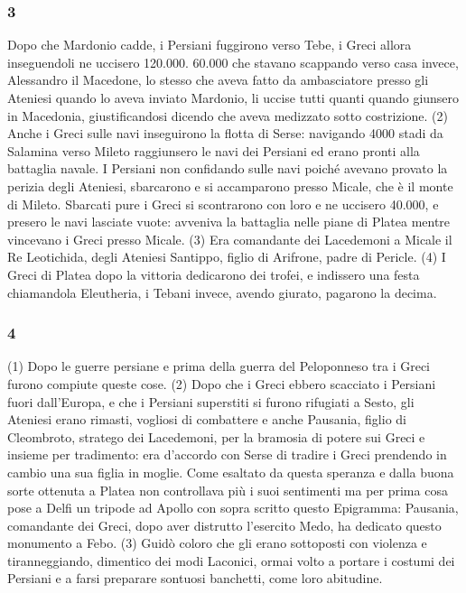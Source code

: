 \subsubsection*{3} Dopo che Mardonio cadde, i Persiani fuggirono verso Tebe, i Greci allora inseguendoli ne uccisero 120.000. 60.000 che stavano scappando verso casa invece, Alessandro il Macedone, lo stesso che aveva fatto da ambasciatore presso gli Ateniesi quando lo aveva inviato Mardonio, li uccise tutti quanti quando giunsero in Macedonia, giustificandosi dicendo che aveva medizzato sotto costrizione. (2) Anche i Greci sulle navi inseguirono la flotta di Serse: navigando 4000 stadi da Salamina verso Mileto raggiunsero le navi dei Persiani ed erano pronti alla battaglia navale. I Persiani non confidando sulle navi poiché avevano provato la perizia degli Ateniesi, sbarcarono e si accamparono presso Micale, che è il monte di Mileto. Sbarcati pure i Greci si scontrarono con loro e ne uccisero 40.000, e presero le navi lasciate vuote: avveniva la battaglia nelle piane di Platea mentre vincevano i Greci presso Micale. (3) Era comandante dei Lacedemoni a Micale il Re Leotichida, degli Ateniesi Santippo, figlio di Arifrone, padre di Pericle. (4) I Greci di Platea dopo la vittoria dedicarono dei trofei, e indissero una festa chiamandola Eleutheria, i Tebani invece, avendo giurato, pagarono la decima.

\subsubsection*{4} (1) Dopo le guerre persiane e prima della guerra del Peloponneso tra i Greci furono compiute queste cose. 
(2) Dopo che i Greci ebbero scacciato i Persiani fuori dall'Europa, e che i Persiani superstiti si furono rifugiati  a Sesto, gli Ateniesi erano rimasti, vogliosi di combattere e anche Pausania, figlio di Cleombroto, stratego dei Lacedemoni, per la bramosia di potere sui Greci e insieme per tradimento: era d'accordo con Serse di tradire i Greci prendendo in cambio una sua figlia in moglie. Come esaltato da questa speranza e dalla buona sorte ottenuta a Platea non controllava più i suoi sentimenti ma per prima cosa pose a Delfi un tripode ad Apollo con sopra scritto questo Epigramma: Pausania, comandante dei Greci, dopo aver distrutto l'esercito Medo, ha dedicato questo monumento a Febo. (3) Guidò coloro che gli erano sottoposti con violenza e tiranneggiando, dimentico dei modi Laconici, ormai volto a portare i costumi dei Persiani e a farsi preparare sontuosi banchetti, come loro abitudine.

